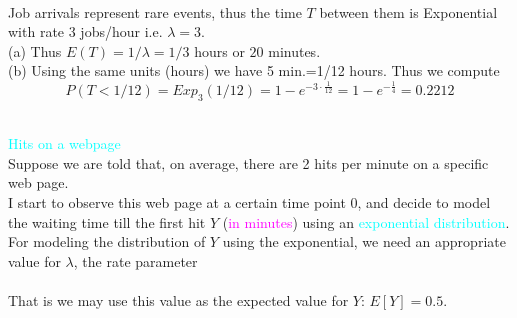 \documentclass[20pt,landscape]{foils}
\newcommand{\no}{\noindent}
\newcommand \h {\hspace*{.3in}}
\begin{document}
 \foilhead[-.7in]{\textcolor{blue}{Example 4.5 (Baron)}}\vspace{.01in}
  \no {\textcolor{magenta}{Example:}}{\textcolor{cyan}{Jobs are sent to a printer  at an average of 3 jobs per hour. (a) What is the expected time between jobs? (b) What is the  probability that the next job is sent within 5 minutes?}}\\[.1in]
 \no {\textcolor{magenta}{Solution:}} Job arrivals represent rare events, thus the time $T$ between them is Exponential with rate 3 jobs/hour i.e. $\lambda=3$.\\[.1in]
\no \h (a) Thus $E(T)=1/\lambda= 1/3$ hours or $20$ minutes.\\[.1in]
\no \h (b) Using the same units (hours) we have 5 min.=1/12 hours. Thus we compute 
$$P(T<1/12) = Exp_{3}(1/12)=1-e^{-3 \cdot\frac{1}{12}}=1-e^{-\frac{1}{4}}=0.2212$$
    
\foilhead[-.7in]{\textcolor{blue}{Exponential Distribution: Example}}\vspace{.01in}    
\no {\textcolor{red}{Note: The following example will be continued throughout the remainder of this class.}}\\[.1in]
\no {\textcolor{magenta}{Example:}} {\textcolor{cyan}{Hits on a webpage}}\\[.1in]
\no Suppose we are told that, on average, there are 2 hits per minute on a specific web page. \\[.1in]
\no I start to observe this web page at a certain time point 0, and decide to model the waiting time till the first hit $Y$ ({\textcolor{magenta}{in minutes}}) using an {\textcolor{cyan}{exponential distribution}}.\\[.1in]
\no For modeling the distribution of $Y$ using the exponential, we need an appropriate value for $\lambda$, the rate parameter\\[.1in]
\no {\textcolor{red}{Since, on average there are 2 hits per minute, the average waiting time between hits of 0.5 minutes.}}\\[.1in]
\no That is we may use this value as the expected value for $Y$: $E[Y] = 0.5$.
    
\end{document}
